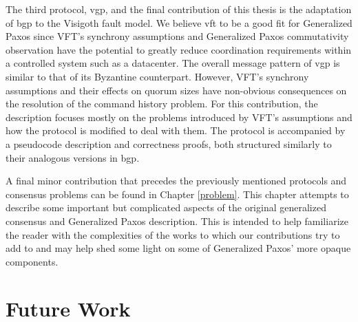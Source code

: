 The third protocol, \acrlong{vgp}, and the final contribution of this thesis is the adaptation of \acrshort{bgp} to the Visigoth fault model. We believe \acrshort{vft} to be a good fit for Generalized Paxos since VFT's synchrony assumptions and Generalized Paxos commutativity observation have the potential to greatly reduce coordination requirements within a controlled system such as a datacenter. The overall message pattern of \acrshort{vgp} is similar to that of its Byzantine counterpart. However, VFT's synchrony assumptions and their effects on quorum sizes have non-obvious consequences on the resolution of the command history problem. For this contribution, the description focuses mostly on the problems introduced by VFT's assumptions and how the protocol is modified to deal with them. The protocol is accompanied by a pseudocode description and correctness proofs, both structured similarly to their analogous versions in \acrshort{bgp}. \par
A final minor contribution that precedes the previously mentioned protocols and consensus problems can be found in Chapter \ref{problem}. This chapter attempts to describe some important but complicated aspects of the original generalized consensus and Generalized Paxos description. This is intended to help familiarize the reader with the complexities of the works to which our contributions try to add to and may help shed some light on some of Generalized Paxos' more opaque components.

\section{Future Work}

